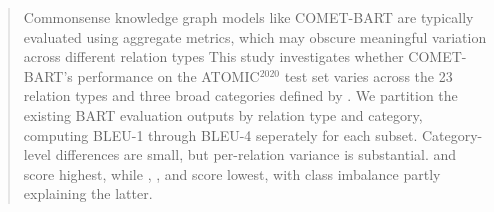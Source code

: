 \begin{abstract}

    
    Commonsense knowledge graph models like COMET-BART are typically evaluated using aggregate metrics, which may obscure meaningful variation across different relation types
    This study investigates whether COMET-BART's performance on the ATOMIC$^{2020}$ test set varies across the 23 relation types and three broad categories defined by \citet{hwang2021cometatomic}.
    We partition the existing BART evaluation outputs by relation type and category, computing BLEU-1 through BLEU-4 seperately for each subset.
    Category-level differences are small, but per-relation variance is substantial.  and  score highest, while , , and  score lowest, with class imbalance partly explaining the latter.







\end{abstract}